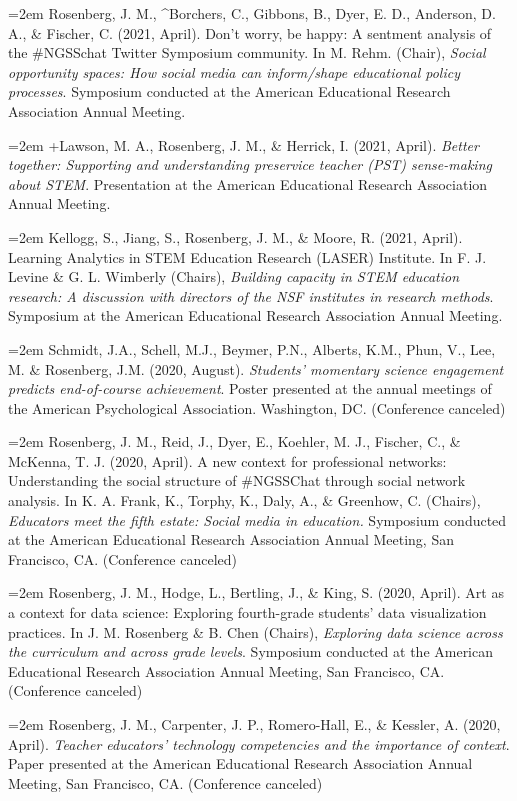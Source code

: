 \documentclass[
  14,
]{article}
\begin{document}
\hangindent=2em Rosenberg, J. M., \^{}Borchers, C., Gibbons, B., Dyer,
E. D., Anderson, D. A., \& Fischer, C. (2021, April). Don't worry, be
happy: A sentment analysis of the \#NGSSchat Twitter Symposium
community. In M. Rehm. (Chair), \emph{Social opportunity spaces: How
social media can inform/shape educational policy processes}. Symposium
conducted at the American Educational Research Association Annual
Meeting.

\hangindent=2em +Lawson, M. A., Rosenberg, J. M., \& Herrick, I. (2021,
April). \emph{Better together: Supporting and understanding preservice
teacher (PST) sense-making about STEM}. Presentation at the American
Educational Research Association Annual Meeting.

\hangindent=2em Kellogg, S., Jiang, S., Rosenberg, J. M., \& Moore, R.
(2021, April). Learning Analytics in STEM Education Research (LASER)
Institute. In F. J. Levine \& G. L. Wimberly (Chairs), \emph{Building
capacity in STEM education research: A discussion with directors of the
NSF institutes in research methods}. Symposium at the American
Educational Research Association Annual Meeting.

\hangindent=2em Schmidt, J.A., Schell, M.J., Beymer, P.N., Alberts,
K.M., Phun, V., Lee, M. \& Rosenberg, J.M. (2020, August).
\emph{Students' momentary science engagement predicts end-of-course
achievement}. Poster presented at the annual meetings of the American
Psychological Association. Washington, DC. (Conference canceled)

\hangindent=2em Rosenberg, J. M., Reid, J., Dyer, E., Koehler, M. J.,
Fischer, C., \& McKenna, T. J. (2020, April). A new context for
professional networks: Understanding the social structure of \#NGSSChat
through social network analysis. In K. A. Frank, K., Torphy, K., Daly,
A., \& Greenhow, C. (Chairs), \emph{Educators meet the fifth estate:
Social media in education.} Symposium conducted at the American
Educational Research Association Annual Meeting, San Francisco, CA.
(Conference canceled)

\hangindent=2em Rosenberg, J. M., Hodge, L., Bertling, J., \& King, S.
(2020, April). Art as a context for data science: Exploring fourth-grade
students' data visualization practices. In J. M. Rosenberg \& B. Chen
(Chairs), \emph{Exploring data science across the curriculum and across
grade levels}. Symposium conducted at the American Educational Research
Association Annual Meeting, San Francisco, CA. (Conference canceled)

\hangindent=2em Rosenberg, J. M., Carpenter, J. P., Romero-Hall, E., \&
Kessler, A. (2020, April). \emph{Teacher educators' technology
competencies and the importance of context}. Paper presented at the
American Educational Research Association Annual Meeting, San Francisco,
CA. (Conference canceled)
\end{document}
